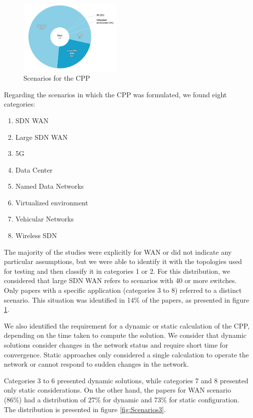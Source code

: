 \documentclass{IEEEtran}
\begin{document}
\begin{figure}
    \centering
    \includegraphics[width=0.45\textwidth]{Pictures/scenario1.png}
    \caption{Scenarios for the CPP}
    \label{fig:Scenarios2}
\end{figure}

Regarding the scenarios in which the CPP was formulated, we found eight categories: 

\begin{enumerate}
\item SDN WAN
\item Large SDN WAN
\item 5G
\item Data Center
\item Named Data Networks
\item Virtualized environment
\item Vehicular Networks
\item Wireless SDN
\end{enumerate}

The majority of the studies were explicitly for WAN or did not indicate any particular assumptions, but we were able to identify it with the topologies used for testing and then classify it in categories 1 or 2. For this distribution, we considered that large SDN WAN refers to scenarios with 40 or more switches. Only papers with a specific application (categories 3 to 8) referred to a distinct scenario. This situation was identified in 14\% of the papers, as presented in figure \ref{fig:Scenarios2}. 

We also identified the requirement for a dynamic or static calculation of the CPP, depending on the time taken to compute the solution. We consider that dynamic solutions consider changes in the network status and require short time for convergence. Static approaches only considered a single calculation to operate the network or cannot respond to sudden changes in the network. 

Categories 3 to 6 presented dynamic solutions, while categories 7 and 8 presented only static considerations. On the other hand, the papers for WAN scenario (86\%) had a distribution of 27\% for dynamic and 73\% for static configuration. The distribution is presented in figure \ref{fig:Scenarios3}. 
\end{document}

